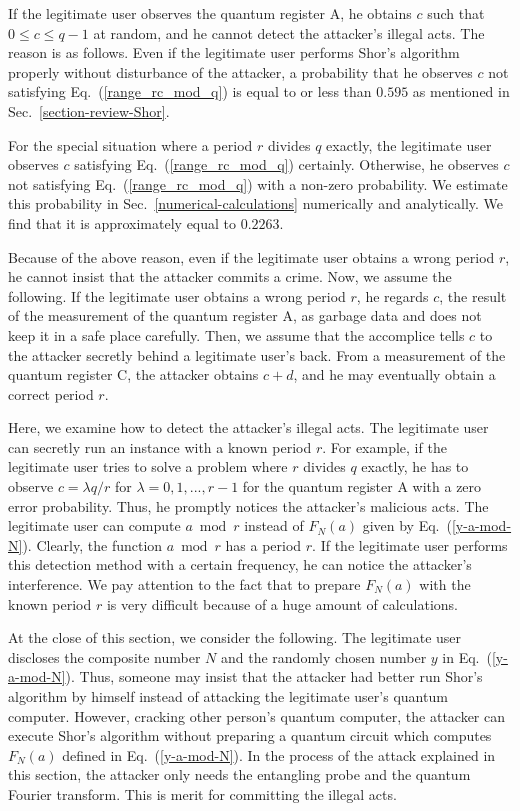 \documentclass[12pt]{article}
\begin{document}
If the legitimate user observes the quantum register A,
he obtains $c$ such that
$0\leq c\leq q-1$
at random,
and he cannot detect the attacker's illegal acts.
The reason is as follows.
Even if the legitimate user performs Shor's algorithm properly without disturbance of the attacker,
a probability that he observes $c$ not satisfying Eq.~(\ref{range_rc_mod_q}) is equal to or less than $0.595$
as mentioned in Sec.~\ref{section-review-Shor}.

For the special situation where a period $r$ divides $q$ exactly,
the legitimate user observes $c$ satisfying Eq.~(\ref{range_rc_mod_q}) certainly.
Otherwise,
he observes $c$ not satisfying Eq.~(\ref{range_rc_mod_q}) with a non-zero probability.
We estimate this probability in Sec.~\ref{numerical-calculations}
numerically and analytically.
We find that it is approximately equal to $0.2263$.

Because of the above reason,
even if the legitimate user obtains a wrong period $r$,
he cannot insist that the attacker commits a crime.
Now,
we assume the following.
If the legitimate user obtains a wrong period $r$,
he regards $c$,
the result of the measurement of the quantum register A,
as garbage data and does not keep it in a safe place carefully.
Then,
we assume that the accomplice tells $c$ to the attacker secretly behind a legitimate user's back.
From a measurement of the quantum register C,
the attacker obtains $c+d$,
and he may eventually obtain a correct period $r$.

Here,
we examine how to detect the attacker's illegal acts.
The legitimate user can secretly run an instance with a known period $r$.
For example,
if the legitimate user tries to solve a problem where $r$ divides $q$ exactly,
he has to observe
$c=\lambda q/r$ for $\lambda=0,1,...,r-1$
for the quantum register A
with a zero error probability.
Thus,
he promptly notices the attacker's malicious acts.
The legitimate user can compute $a \bmod r$ instead of $F_{N}(a)$ given by Eq.~(\ref{y-a-mod-N}).
Clearly,
the function $a \bmod r$ has a period $r$.
If the legitimate user performs this detection method with a certain frequency,
he can notice the attacker's interference.
We pay attention to the fact that to prepare $F_{N}(a)$ with the known period $r$ is very difficult
because of a huge amount of calculations.

At the close of this section,
we consider the following.
The legitimate user discloses the composite number $N$ and the randomly chosen number $y$ in Eq.~(\ref{y-a-mod-N}).
Thus,
someone may insist that the attacker had better run Shor's algorithm by himself instead of attacking the legitimate user's quantum computer.
However,
cracking other person's quantum computer,
the attacker can execute Shor's algorithm without preparing a quantum circuit
which computes $F_{N}(a)$ defined in Eq.~(\ref{y-a-mod-N}).
In the process of the attack explained in this section,
the attacker only needs the entangling probe and the quantum Fourier transform.
This is merit for committing the illegal acts.
\end{document}
